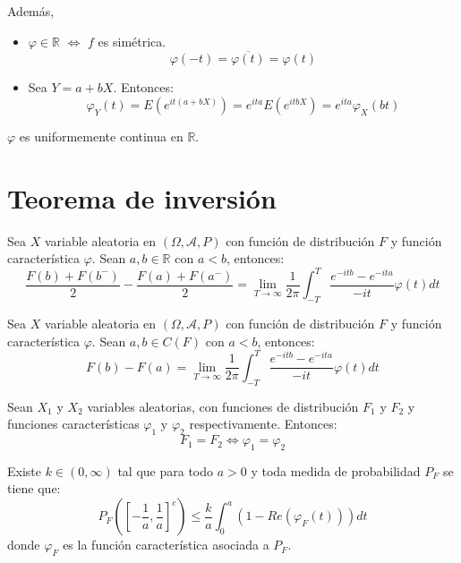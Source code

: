 Además,
\begin{itemize}
    \item $\varphi \in \mathbb{R}$ $\Leftrightarrow$ $f$ es simétrica.
          $$\varphi(-t) = \overline{\varphi(t)} = \varphi(t)$$
    \item Sea $Y = a + bX$. Entonces:
          $$\varphi_Y(t) = E(e^{it(a+bX)}) = e^{ita} E(e^{itbX}) = e^{ita} \varphi_X(bt)$$
\end{itemize}

\begin{theorem}
    $\varphi$ es uniformemente continua en $\mathbb{R}$.
\end{theorem}

\section{Teorema de inversión}
\begin{theorem}
    Sea $X$ variable aleatoria en $(\Omega, \mathcal{A}, P)$ con función de distribución $F$ y función característica $\varphi$.
    Sean $a, b \in \mathbb{R}$ con $a < b$, entonces:
    $$\frac{F(b)+F(b^-)}{2} - \frac{F(a)+F(a^-)}{2} = \lim\limits_{T \to \infty} \frac{1}{2\pi} \int_{-T}^T \frac{e^{-itb}-e^{-ita}}{-it} \varphi(t)dt$$
\end{theorem}

\begin{corollary}
    Sea $X$ variable aleatoria en $(\Omega, \mathcal{A}, P)$ con función de distribución $F$ y función característica $\varphi$.
    Sean $a, b \in C(F)$ con $a < b$, entonces:
    $$F(b) - F(a) = \lim\limits_{T \to \infty} \frac{1}{2\pi} \int_{-T}^T \frac{e^{-itb}-e^{-ita}}{-it} \varphi(t)dt$$
\end{corollary}

\begin{theorem}[Unicidad]
    Sean $X_1$ y $X_2$ variables aleatorias, con funciones de distribución $F_1$ y $F_2$ y funciones características $\varphi_1$ y $\varphi_2$ respectivamente.
    Entonces:
    $$F_1 = F_2 \Leftrightarrow \varphi_1 = \varphi_2$$
\end{theorem}

\begin{theorem}
    Existe $k \in (0, \infty)$ tal que para todo $a > 0$ y toda medida de probabilidad $P_F$ se tiene que:
    $$P_F \left(\left[-\frac{1}{a}, \frac{1}{a}\right]^c\right) \leq \frac{k}{a} \int_0^a (1 - Re(\varphi_F(t)))dt$$
    donde $\varphi_F$ es la función característica asociada a $P_F$.
\end{theorem}

